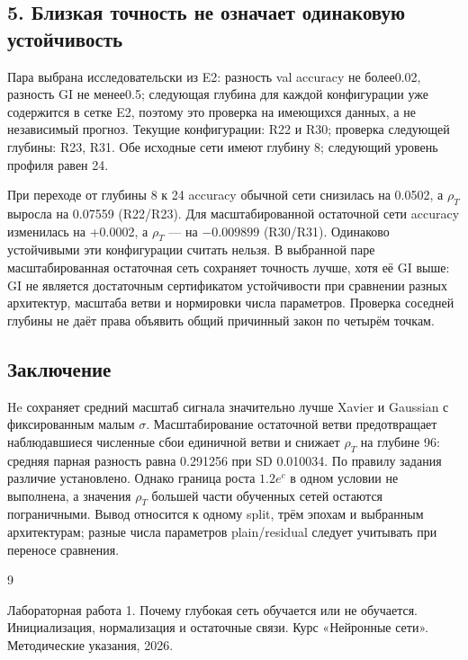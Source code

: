 \subsection*{5. Близкая точность не означает одинаковую устойчивость}

Пара выбрана исследовательски из E2: разность val accuracy не более0.02, разность GI не менее0.5; следующая глубина для каждой конфигурации уже содержится в сетке E2, поэтому это проверка на имеющихся данных, а не независимый прогноз. Текущие конфигурации: R22 и R30; проверка следующей глубины: R23, R31. Обе исходные сети имеют глубину 8; следующий уровень профиля равен 24.

\begin{table}[H]\centering\small\setlength{\tabcolsep}{4pt}
\caption{Проверка следующей глубины для конфигураций с близкой точностью.}
\FitTable{}
\end{table}

При переходе от глубины 8 к 24 accuracy обычной сети снизилась на 0.0502, а $\rho_T$ выросла на 0.07559 (R22/R23). Для масштабированной остаточной сети accuracy изменилась на +0.0002, а $\rho_T$ --- на $-0.009899$ (R30/R31). Одинаково устойчивыми эти конфигурации считать нельзя. В выбранной паре масштабированная остаточная сеть сохраняет точность лучше, хотя её GI выше: GI не является достаточным сертификатом устойчивости при сравнении разных архитектур, масштаба ветви и нормировки числа параметров. Проверка соседней глубины не даёт права объявить общий причинный закон по четырём точкам.


\subsection*{Заключение}
He сохраняет средний масштаб сигнала значительно лучше Xavier и Gaussian с фиксированным малым $\sigma$. Масштабирование остаточной ветви предотвращает наблюдавшиеся численные сбои единичной ветви и снижает $\rho_T$ на глубине 96: средняя парная разность равна 0.291256 при SD 0.010034. По правилу задания различие установлено. Однако граница роста $1.2e^c$ в одном условии не выполнена, а значения $\rho_T$ большей части обученных сетей остаются пограничными. Вывод относится к одному split, трём эпохам и выбранным архитектурам; разные числа параметров plain/residual следует учитывать при переносе сравнения.
\clearpage
\renewcommand{\refname}{Список использованных источников}
\begin{thebibliography}{9}
 Лабораторная работа 1. Почему глубокая сеть обучается или не обучается. Инициализация, нормализация и остаточные связи. Курс «Нейронные сети». Методические указания, 2026.
\end{thebibliography}
\clearpage

